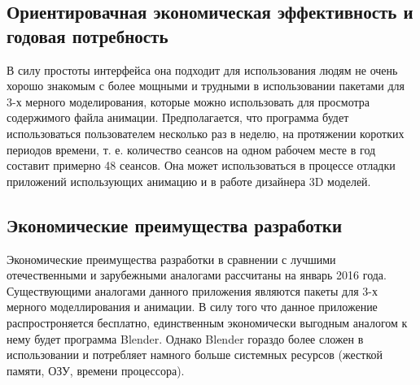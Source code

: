 \subsection{Ориентировачная экономическая эффективность и годовая потребность}
В силу простоты интерфейса она подходит для использования людям не очень хорошо знакомым с более мощными и трудными в использовании пакетами для 3-х мерного моделирования, которые можно использовать для просмотра содержимого файла анимации.
Предполагается, что программа будет использоваться пользователем несколько раз в неделю, на протяжении коротких периодов времени, т. е. количество сеансов на одном рабочем месте в год составит примерно 48 сеансов. Она может использоваться в процессе отладки приложений использующих анимацию и в работе дизайнера 3D моделей.

\subsection{Экономические преимущества разработки}
Экономические преимущества разработки в сравнении с лучшими отечественными и зарубежными аналогами рассчитаны на январь 2016 года. Существующими аналогами данного приложения являются пакеты для 3-х мерного моделлирования и анимации. В силу того что данное приложение распростроняется бесплатно, единственным экономически выгодным аналогом к нему будет программа Blender. Однако Blender гораздо более сложен в использовании и потребляет намного больше системных ресурсов (жесткой памяти, ОЗУ, времени процессора).